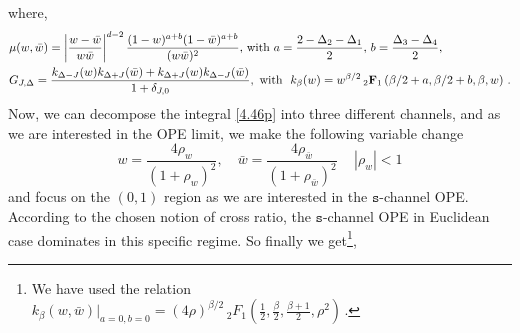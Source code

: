 where,
\begin{align}
    \begin{split}
  &      \mu(w,\bar w)=\left|\frac{w-\bar w}{w\bar w}\right| ^{d-2}\frac{(1-w)^{a+b}(1-\bar w)^{a+b}}{(w\bar w)^2},\,\textrm{with}\,\,a=\frac{2-\Delta_2-\Delta_1}{2},\,b=\frac{\Delta_3-\Delta_4}{2},\\ &
  G_{J,\Delta}=\frac{k_{\Delta-J}(w)k_{\Delta+J}(\bar w)+k_{\Delta+J}(w)k_{\Delta-J}(\bar w)}{1+\delta_{J,0}}, \textrm{\,\,with }\,\,k_{\beta}(w)=w^{\beta/2}\,{}_{2}\mathbf{F}_1\left(\beta/2+a,\beta/2+b,\beta,w\right)\,.\label{4.47y}
    \end{split}
\end{align}
Now, we can decompose the integral \eqref{4.46p} into three different channels, and as we are interested in the OPE limit, we make the following variable change $$w=\frac{4\rho_w}{(1+\rho_w)^2},\quad {\bar w}=\frac{4\rho_{\bar w}}{(1+\rho_{\bar w})^2}\,\quad |\rho_w|<1 $$ and focus on the $(0,1)$ region as we are interested in the $\texttt{s}$-channel OPE. According to the chosen notion of cross ratio, the $\texttt{s}$-channel OPE in Euclidean case dominates in this specific regime. So finally we get\footnote{We have used the relation $k_{\beta}(w,\bar w)\Bigg|_{a=0,b=0}=(4\rho)^{\beta/2}\,_2F_1(\frac{1}{2},\frac{\beta}{2},\frac{\beta+1}{2},\rho^2)\,.$},
